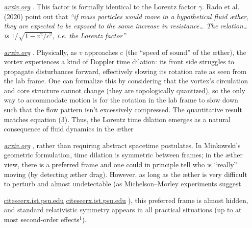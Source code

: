 \documentclass[aps,preprint,superscriptaddress]{revtex4}
\begin{document}
\href{https://arxiv.org/pdf/2012.07395#:~:text=which%20contains%20the%20familiar%20Lorentz,the%20Lorentz%20factor}{\textit{arxiv.org}}
. This factor is formally identical to the Lorentz factor $\gamma$. Rado et al. (2020) point out that \textit{“if mass particles would move in a hypothetical fluid æther, they are expected to be exposed to the same increase in resistance… The relation… is $1/\sqrt{1-v^2/c^2}$, i.e. the Lorentz factor”}

\href{https://arxiv.org/pdf/2012.07395#:~:text=which%20contains%20the%20familiar%20Lorentz,the%20Lorentz%20factor}{\textit{arxiv.org}}
. Physically, as $v$ approaches $c$ (the “speed of sound” of the æther), the vortex experiences a kind of Doppler time dilation: its front side struggles to propagate disturbances forward, effectively slowing its rotation rate as seen from the lab frame. One can formalize this by considering that the vortex’s circulation and core structure cannot change (they are topologically quantized), so the only way to accommodate motion is for the rotation in the lab frame to slow down such that the flow pattern isn’t excessively compressed. The quantitative result matches equation (3). Thus, the Lorentz time dilation emerges as a natural consequence of fluid dynamics in the æther

\href{https://arxiv.org/pdf/2012.07395#:~:text=So%2C%20if%20mass%20particles%20would,If%20anything%2C%20there%20would%20have}{\textit{arxiv.org}}
, rather than requiring abstract spacetime postulates. In Minkowski’s geometric formulation, time dilation is symmetric between frames; in the æther view, there is a preferred frame and one could in principle tell who is “really” moving (by detecting æther drag). However, as long as the æther is very difficult to perturb and almost undetectable (as Michelson–Morley experiments suggest

\href{https://citeseerx.ist.psu.edu/document?repid=rep1&type=pdf&doi=25483f1ebc9dc442a9f1505a49d96eb35e92e3f4#:~:text=21,ph%2F0205379%20%28Oct%202002}{citeseerx.ist.psu.edu}
\href{https://citeseerx.ist.psu.edu/document?repid=rep1&type=pdf&doi=25483f1ebc9dc442a9f1505a49d96eb35e92e3f4#:~:text=22.%20Munera%2C%20H.%2C%20%E2%80%9CMichelson,938.%20Also%20published%20at}{citeseerx.ist.psu.edu}
), this preferred frame is almost hidden, and standard relativistic symmetry appears in all practical situations (up to at most second-order effects${}^{1}$).
\end{document}

